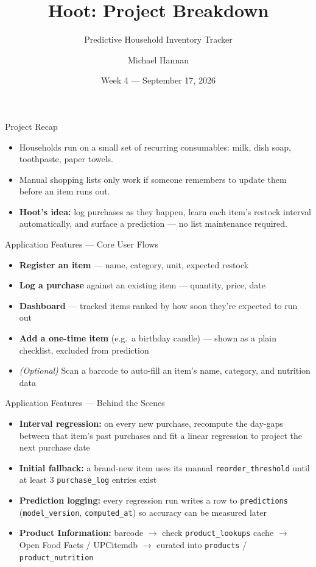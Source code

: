 \documentclass[aspectratio=169]{beamer}
\title[Hoot: Project Breakdown]{Hoot: Project Breakdown}
\subtitle{Predictive Household Inventory Tracker}
\author{Michael Hannan}
\date{Week 4 --- September 17, 2026}
\begin{document}
\begin{frame}
  \titlepage
\end{frame}

\begin{frame}{Project Recap}
  \begin{itemize}
    \item Households run on a small set of recurring consumables: milk, dish soap, toothpaste, paper towels.
    \item Manual shopping lists only work if someone remembers to update them before an item runs out.
    \item \textbf{Hoot's idea:} log purchases as they happen, learn each item's restock interval automatically, and surface a prediction --- no list maintenance required.
  \end{itemize}
\end{frame}

\begin{frame}{Application Features --- Core User Flows}
  \begin{itemize}
    \item \textbf{Register an item} --- name, category, unit, expected restock
    \item \textbf{Log a purchase} against an existing item --- quantity, price, date
    \item \textbf{Dashboard} --- tracked items ranked by how soon they're expected to run out
    \item \textbf{Add a one-time item} (e.g.\ a birthday candle) --- shown as a plain checklist, excluded from prediction
    \item \emph{(Optional)} Scan a barcode to auto-fill an item's name, category, and nutrition data
  \end{itemize}
\end{frame}

\begin{frame}{Application Features --- Behind the Scenes}
  \begin{itemize}
    \item \textbf{Interval regression:} on every new purchase, recompute the day-gaps between that item's past purchases and fit a linear regression to project the next purchase date
    \item \textbf{Initial fallback:} a brand-new item uses its manual \texttt{reorder\_threshold} until at least 3 \texttt{purchase\_log} entries exist
    \item \textbf{Prediction logging:} every regression run writes a row to \texttt{predictions} (\texttt{model\_version}, \texttt{computed\_at}) so accuracy can be measured later
    \item \textbf{Product Information:} barcode $\to$ check \texttt{product\_lookups} cache $\to$ Open Food Facts / UPCitemdb $\to$ curated into \texttt{products} / \texttt{product\_nutrition}
  \end{itemize}
\end{frame}
\end{document}

